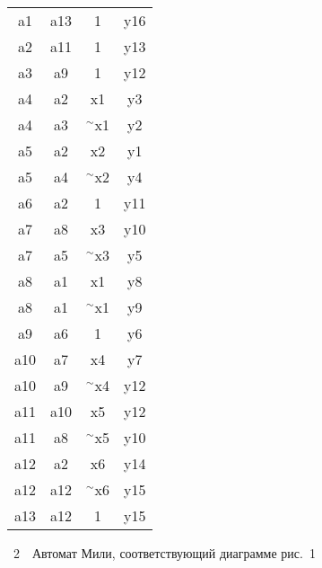 \begin{multicols}{2}
{ \begin{center} %
\begin{tabular}{cccc}
                            a1&a13&1&y16\\
                            a2&a11&1&y13\\
                            a3&a9&1&y12\\
                            a4&a2&x1&y3\\
                            a4&a3&$^\sim$x1&y2\\
                            a5&a2&x2&y1\\
                            a5&a4&$^\sim$x2&y4\\
                            a6&a2&1&y11\\
                            a7&a8&x3&y10\\
                            a7&a5&$^\sim$x3&y5\\
                            a8&a1&x1&y8\\
                            a8&a1&$^\sim$x1&y9\\
                            a9&a6&1&y6\\
                            a10&a7&x4&y7\\
                            a10&a9&$^\sim$x4&y12\\
                            a11&a10&x5&y12\\
                            a11&a8&$^\sim$x5&y10\\
                            a12&a2&x6&y14\\
                            a12&a12&$^\sim$x6&y15\\
                            a13&a12&1&y15
                            \end{tabular}
                            \end{center}
\vspace*{9pt}


\noindent
{{\figurename~2}\ \ \small{Автомат Мили, соответствующий диаграмме рис.~1}}


}
\end{multicols}
